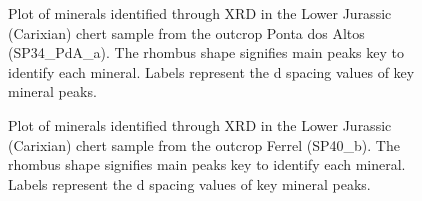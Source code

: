 \documentclass[
  a4paper,
  DIV=11,
  numbers=noendperiod]{scrreprt}
\begin{document}
\begin{figure}


\caption{\label{fig-xrd-sp34}Plot of minerals identified through XRD in
the Lower Jurassic (Carixian) chert sample from the outcrop Ponta dos
Altos (SP34\_PdA\_a). The rhombus shape signifies main peaks key to
identify each mineral. Labels represent the d spacing values of key
mineral peaks.}

\end{figure}%

\begin{figure}


\caption{\label{fig-xrd-sp40}Plot of minerals identified through XRD in
the Lower Jurassic (Carixian) chert sample from the outcrop Ferrel
(SP40\_b). The rhombus shape signifies main peaks key to identify each
mineral. Labels represent the d spacing values of key mineral peaks.}

\end{figure}%
\end{document}
